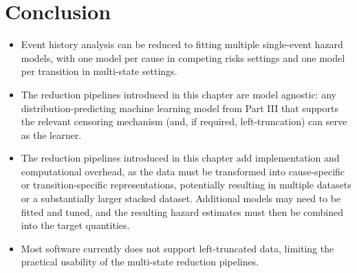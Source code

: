 \documentclass[
  letterpaper,
  krantz2]{style/krantz}
\providecommand{\tightlist}{%
  \setlength{\itemsep}{0pt}\setlength{\parskip}{0pt}}
\begin{document}
\section{Conclusion}\label{conclusion-16}

\begin{tcolorbox}[enhanced jigsaw, toprule=.15mm, bottomtitle=1mm, opacityback=0, breakable, leftrule=.75mm, title={Key takeaways}, toptitle=1mm, bottomrule=.15mm, colback=white, colframe=quarto-callout-warning-color-frame, titlerule=0mm, opacitybacktitle=0.6, coltitle=black, rightrule=.15mm, left=2mm, colbacktitle=quarto-callout-warning-color!10!white, arc=.35mm]

\begin{itemize}
\tightlist
\item
  Event history analysis can be reduced to fitting multiple single-event
  hazard models, with one model per cause in competing risks settings
  and one model per transition in multi-state settings.
\item
  The reduction pipelines introduced in this chapter are model agnostic:
  any distribution-predicting machine learning model from Part III that
  supports the relevant censoring mechanism (and, if required,
  left-truncation) can serve as the learner.
\item
  The reduction pipelines introduced in this chapter add implementation
  and computational overhead, as the data must be transformed into
  cause-specific or transition-specific representations, potentially
  resulting in multiple datasets or a substantially larger stacked
  dataset. Additional models may need to be fitted and tuned, and the
  resulting hazard estimates must then be combined into the target
  quantities.
\item
  Most software currently does not support left-truncated data, limiting
  the practical usability of the multi-state reduction pipelines.
\end{itemize}

\end{tcolorbox}
\end{document}
